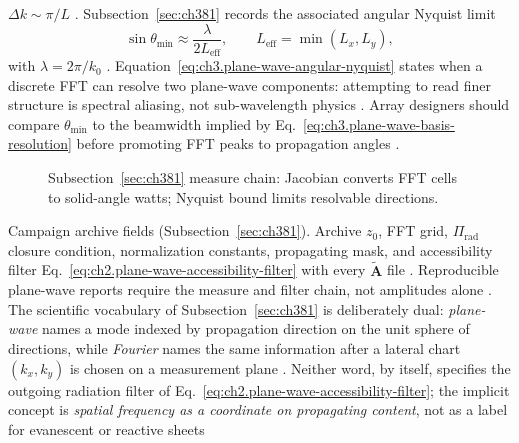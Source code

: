 \(\Delta k\sim\pi/L\) \cite{jackson1999}. Subsection~\ref{sec:ch381} records the associated angular Nyquist limit
\begin{equation}
\label{eq:ch3.plane-wave-angular-nyquist}
\sin\theta_{\min}
\approx
\frac{\lambda}{2L_{\mathrm{eff}}},
\qquad
L_{\mathrm{eff}}=\min(L_{x},L_{y}),
\end{equation}
with \(\lambda=2\pi/k_{0}\) \cite{stratton1941}. Equation~\eqref{eq:ch3.plane-wave-angular-nyquist} states when a discrete FFT can
resolve two plane-wave components: attempting to read finer structure is spectral aliasing, not sub-wavelength physics
\cite{harrington2001}. Array designers should compare \(\theta_{\min}\) to the beamwidth implied by
Eq.~\eqref{eq:ch3.plane-wave-basis-resolution} before promoting FFT peaks to propagation angles \cite{jackson1999}.
\begin{figure}[t]
\centering
{}
\caption{Subsection~\ref{sec:ch381} measure chain: Jacobian converts FFT cells to solid-angle watts; Nyquist bound limits resolvable directions.}
\label{fig:ch3.381-measure-chain}
\end{figure}
Campaign archive fields (Subsection~\ref{sec:ch381}). Archive \(z_{0}\), FFT grid, \(\Pi_{\mathrm{rad}}\) closure condition, normalization constants, propagating mask, and accessibility filter
Eq.~\eqref{eq:ch2.plane-wave-accessibility-filter} with every \(\widetilde{\mathbf{A}}\) file \cite{harrington2001}.
Reproducible plane-wave reports require the measure and filter chain, not amplitudes alone \cite{harrington2001}.
The scientific vocabulary of Subsection~\ref{sec:ch381} is deliberately dual: \emph{plane-wave} names a mode indexed by
propagation direction on the unit sphere of directions, while \emph{Fourier} names the same information after a lateral
chart \((k_{x},k_{y})\) is chosen on a measurement plane \cite{jackson1999}. Neither word, by itself,
specifies the outgoing radiation filter of Eq.~\eqref{eq:ch2.plane-wave-accessibility-filter}; the implicit concept is
\emph{spatial frequency as a coordinate on propagating content}, not as a label for evanescent or reactive sheets
